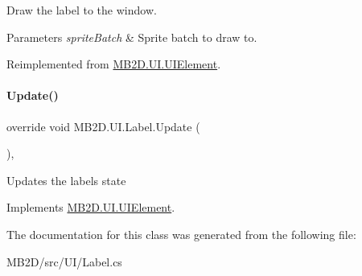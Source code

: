 Draw the label to the window. 


\begin{DoxyParams}{Parameters}
{\em sprite\+Batch} & Sprite batch to draw to.\\
\hline
\end{DoxyParams}


Reimplemented from \hyperlink{class_m_b2_d_1_1_u_i_1_1_u_i_element_afec98e6e38cb0dbc17a5db6d6a3d5ba5}{M\+B2\+D.\+U\+I.\+U\+I\+Element}.

\hypertarget{class_m_b2_d_1_1_u_i_1_1_label_ae4cc8f88f75b0d16d983bb754d214ef4}{}\label{class_m_b2_d_1_1_u_i_1_1_label_ae4cc8f88f75b0d16d983bb754d214ef4} 
\paragraph{\texorpdfstring{Update()}{Update()}}
{\footnotesize\ttfamily override void M\+B2\+D.\+U\+I.\+Label.\+Update (\begin{DoxyParamCaption}{ }\end{DoxyParamCaption})\hspace{0.3cm}{\ttfamily [inline]}, {\ttfamily [virtual]}}



Updates the labels state 



Implements \hyperlink{class_m_b2_d_1_1_u_i_1_1_u_i_element_aa97bcbe44f3fac8a13e2febca23b2d4d}{M\+B2\+D.\+U\+I.\+U\+I\+Element}.



The documentation for this class was generated from the following file\+:\begin{DoxyCompactItemize}
\item 
M\+B2\+D/src/\+U\+I/Label.\+cs\end{DoxyCompactItemize}
